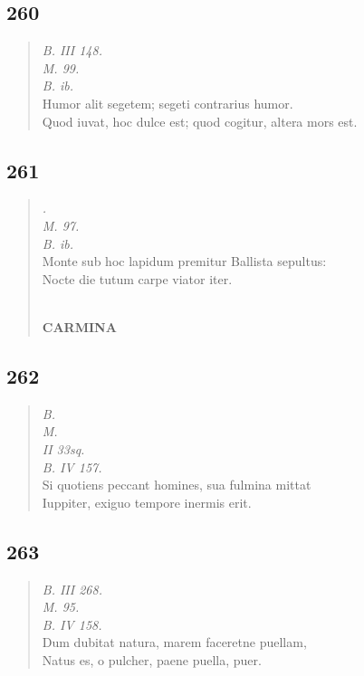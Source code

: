 \documentclass[11pt, a4paper]{report}
\begin{document}
            \subsection*{260}
      \begin{verse}
      \textit{B. III 148.} \\ \textit{M. 99.} \\ \textit{B. ib.} \\ Humor alit segetem; segeti contrarius humor. \\ Quod iuvat, hoc dulce est; quod cogitur, altera mors est. \\ 
      \end{verse}
  
            \subsection*{261}
      \begin{verse}
      \textit{.} \\ \textit{M. 97.} \\ \textit{B. ib.} \\ Monte sub hoc lapidum premitur Ballista sepultus: \\ Nocte die tutum carpe viator iter. \\ 
        ﻿\pagebreak 
    \begin{center} \textbf{CARMINA} \end{center} \marginpar{[214]} 
      \end{verse}
  
            \subsection*{262}
      \begin{verse}
      \textit{B.} \\ \textit{M.} \\ \textit{II 33sq.} \\ \textit{B. IV 157.} \\ Si quotiens peccant homines, sua fulmina mittat \\ Iuppiter, exiguo tempore inermis erit. \\ 
      \end{verse}
  
            \subsection*{263}
      \begin{verse}
      \textit{B. III 268.} \\ \textit{M. 95.} \\ \textit{B. IV 158.} \\ Dum dubitat natura, marem faceretne puellam, \\ Natus es, o pulcher, paene puella, puer. \\ 
      \end{verse}
  
\end{document}
